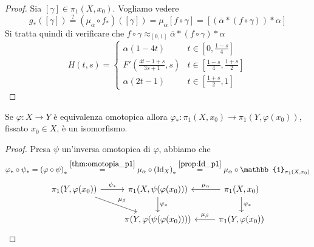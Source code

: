     \begin{proof}
        Sia \([\gamma] \in \pi_{1}{(X, x_{0})}\). Vogliamo vedere
        \[
            g_*{([\gamma])} \overset{?}{=} {(\mu_{\alpha}  \circ
            f_*)}{([\gamma])} = \mu_{\alpha} {[f \circ \gamma]} =
            [{(\overline{\alpha} * {(f \circ \gamma)})} * \alpha]
        \]
        Si tratta quindi di verificare che \(f\circ \gamma \approx_{[0,1]}
        \overline{\alpha} * {(f \circ \gamma)} * \alpha \) 
        \[
          H{(t, s)} = \begin{cases}
              \alpha{(1 - 4t)} & t \in [0, \frac{1-s}{4}] \\
              F'{(\frac{4t - 1 + s}{3s + 1}, s)} & t \in [\frac{1- s}{4},
              \frac{1 + s}{2}]\\
              \alpha{(2t -1)} & t \in [\frac{1 + s}{2}, 1]
          \end{cases}
        \]
    \end{proof}
    \begin{corollary}
        Se \(\varphi : X \to Y\) è equivalenza omotopica allora \(\varphi_* :
        \pi_{1}{(X, x_{0})} \to \pi_{1}{(Y, \varphi {(x_{0})})}\), fissato
        \(x_{0} \in X\), è un isomorfismo.
    \end{corollary}
    \begin{proof}
        Presa \(\psi\) un'inversa omotopica di \(\varphi \), abbiamo che 
        \[
            \varphi_* \circ \psi_* = {(\varphi \circ \psi )}_*
            \overset{\ref{thm:omotopia_p1}}{=}
            \mu_{\alpha} \circ {(\mathrm{Id}_X)}_* \overset{\ref{prop:Id_p1}}{=} \mu_{\alpha} \circ
        \mathbb{1}_{\pi_{1}{(X, x_{0})}} \]%
\[\begin{tikzcd}
	\pi_{1}{(Y, \varphi {(x_{0})})} & \pi_{1}{(X, \psi {(\varphi {(x_{0})})})} &
    \pi_{1}{(X, x_{0})} \\
	& \pi {(Y, \varphi {(\psi {(\varphi {(x_{0})})})})} & \pi_{1}{(Y, \varphi
    {(x_{0})})}
	\arrow["{\psi_*}", from=1-1, to=1-2]
	\arrow["{\mu_\beta}", from=1-1, to=2-2]
	\arrow["{\varphi_*}", from=1-2, to=2-2]
	\arrow["{\mu_\alpha}"', from=1-3, to=1-2]
	\arrow["{\varphi_*}", from=1-3, to=2-3]
	\arrow["{\mu_\beta}"', from=2-3, to=2-2]
\end{tikzcd}\]
    \end{proof}
    
